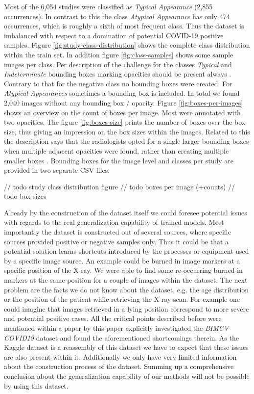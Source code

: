 Most of the 6,054 studies were classified as \textit{Typical Appearance} (2,855 occurrences). In contrast to this the class \textit{Atypical Appearance} has only 474 occurrences, which is roughly a sixth of most frequent class. Thus the dataset is imbalanced with respect to a domination of potential COVID-19 positive samples. Figure \ref{fig:study-class-distribution} shows the complete class distribution within the train set. In addition figure \ref{fig:class-samples} shows some sample images per class. Per description of the challenge for the classes \textit{Typical} and \textit{Indeterminate} bounding boxes marking opacities should be present always \autocite{SIIMKaggleAnnotation}. Contrary to that for the negative class no bounding boxes were created. For \textit{Atypical Appearances} sometimes a bounding box is included. In total we found 2,040 images without any bounding box / opacity. Figure \ref{fig:boxes-per-images} shows an overview on the count of boxes per image. Most were annotated with two opacities. The figure \ref{fig:boxes-size} prints the number of boxes over the box size, thus giving an impression on the box sizes within the images. Related to this the description says that the radiologists opted for a single larger bounding boxes when multiple adjacent opacities were found, rather than creating multiple smaller boxes \autocite{SIIMKaggleAnnotation}. Bounding boxes for the image level and classes per study are provided in two separate CSV files.

// todo study class distribution figure
// todo boxes per image (+counts)
// todo box sizes

Already by the construction of the dataset itself we could foresee potential issues with regards to the real generalization capability of trained models. Most importantly the dataset is constructed out of several sources, where specific sources provided positive or negative samples only. Thus it could be that a potential solution learns shortcuts introduced by the processes or equipment used by a specific image source. An example could be burned in image markers at a specific position of the X-ray. We were able to find some re-occurring burned-in markers at the same position for a couple of images within the dataset. The next problem are the facts we do not know about the dataset, e.g. the age distribution or the position of the patient while retrieving the X-ray scan. For example one could imagine that images retrieved in a lying position correspond to more severe and potential positive cases. All the critical points described before were mentioned within a paper by \citeauthor{degrave2021ai} \autocite{degrave2021ai} this paper explicitly investigated the \textit{BIMCV-COVID19} dataset and found the aforementioned shortcomings therein. As the Kaggle dataset is a reassembly of this dataset we have to expect that these issues are also present within it. Additionally we only have very limited information about the construction process of the dataset. Summing up a comprehensive conclusion about the generalization capability of our methods will not be possible by using this dataset.

